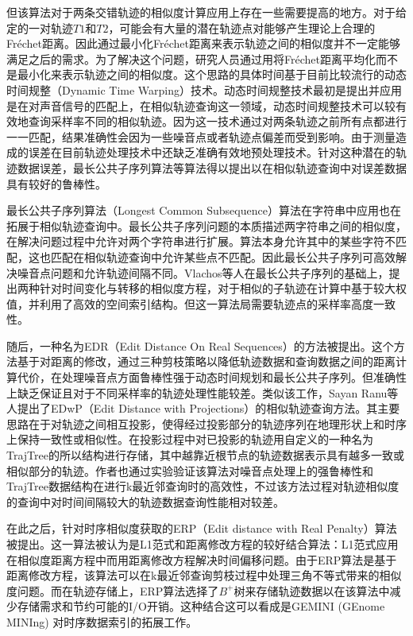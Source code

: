 但该算法对于两条交错轨迹的相似度计算应用上存在一些需要提高的地方。对于给定的一对轨迹$T1$和$T2$，可能会有大量的潜在轨迹点对能够产生理论上合理的Fr\'{e}chet距离。因此通过最小化Fr\'{e}chet距离来表示轨迹之间的相似度并不一定能够满足之后的需求。为了解决这个问题，研究人员通过用将Fr\'{e}chet距离平均化而不是最小化来表示轨迹之间的相似度。这个思路的具体时间基于目前比较流行的动态时间规整（Dynamic Time Warping）技术。动态时间规整技术最初是提出并应用是在对声音信号的匹配上\cite{rabiner1993fundamentals}，在相似轨迹查询这一领域，动态时间规整技术可以较有效地查询采样率不同的相似轨迹。因为这一技术通过对两条轨迹之前所有点都进行一一匹配，结果准确性会因为一些噪音点或者轨迹点偏差而受到影响。由于测量造成的误差在目前轨迹处理技术中还缺乏准确有效地预处理技术。针对这种潜在的轨迹数据误差，最长公共子序列算法\cite{vlachos2002discovering}等算法得以提出以在相似轨迹查询中对误差数据具有较好的鲁棒性。

最长公共子序列算法（Longest Common Subsequence）算法在字符串中应用也在拓展于相似轨迹查询中。最长公共子序列问题的本质描述两字符串之间的相似度，在解决问题过程中允许对两个字符串进行扩展。算法本身允许其中的某些字符不匹配，这也匹配在相似轨迹查询中允许某些点不匹配。因此最长公共子序列可高效解决噪音点问题和允许轨迹间隔不同。Vlachos等人在最长公共子序列的基础上，提出两种针对时间变化与转移的相似度方程\cite{vlachos2002discovering}，对于相似的子轨迹在计算中基于较大权值，并利用了高效的空间索引结构。但这一算法局需要轨迹点的采样率高度一致性。

随后，一种名为EDR\cite{chen2005robust}（Edit Distance On Real Sequences）的方法被提出。这个方法基于对距离的修改，通过三种剪枝策略以降低轨迹数据和查询数据之间的距离计算代价，在处理噪音点方面鲁棒性强于动态时间规划和最长公共子序列。但准确性上缺乏保证且对于不同采样率的轨迹处理性能较差。类似该工作，Sayan Ranu等人提出了EDwP\cite{ranu2015indexing}（Edit Distance with Projections）的相似轨迹查询方法。其主要思路在于对轨迹之间相互投影，使得经过投影部分的轨迹序列在地理形状上和时序上保持一致性或相似性。在投影过程中对已投影的轨迹用自定义的一种名为TrajTree的所以结构进行存储，其中越靠近根节点的轨迹数据表示具有越多一致或相似部分的轨迹。作者也通过实验验证该算法对噪音点处理上的强鲁棒性和TrajTree数据结构在进行k最近邻查询时的高效性，不过该方法过程对轨迹相似度的查询中对时间间隔较大的轨迹数据查询性能相对较差。



在此之后，针对时序相似度获取的ERP（Edit distance with Real Penalty）\cite{chen2004marriage}算法被提出。这一算法被认为是L1范式和距离修改方程的较好结合算法：L1范式应用在相似度距离方程中而用距离修改方程解决时间偏移问题。由于ERP算法是基于距离修改方程，该算法可以在k最近邻查询剪枝过程中处理三角不等式带来的相似度问题。而在轨迹存储上，ERP算法选择了$B^{+}$树来存储轨迹数据以在该算法中减少存储需求和节约可能的I/O开销。这种结合这可以看成是GEMINI (GEnome MINIng) 对时序数据索引的拓展工作。


